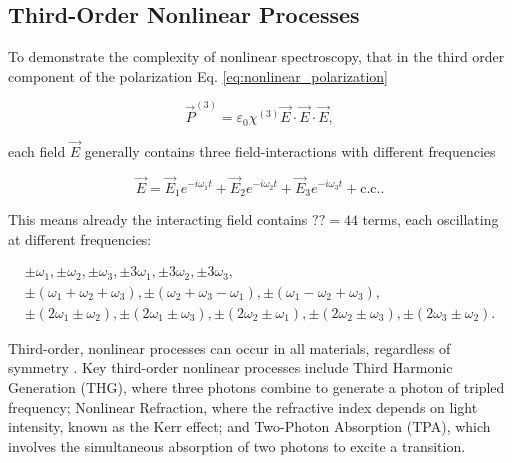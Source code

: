 \subsection{Third-Order Nonlinear Processes}
\label{subsec:third_order}
\noindent
\noindent
To demonstrate the complexity of nonlinear spectroscopy, that in the third order component of the polarization Eq. \eqref{eq:nonlinear_polarization}

\begin{equation}
	\vec{P}^{(3)} = \varepsilon_0 \chi^{(3)} \vec{E} \cdot \vec{E} \cdot \vec{E},
	\label{eq:third_order_polarization}
\end{equation}

each field $\vec{E}$ generally contains three field-interactions with different frequencies

\begin{equation}
\vec{E} = \vec{E}_1 e^{-i \omega_1 t} + \vec{E}_2 e^{-i \omega_2 t} + \vec{E}_3 e^{-i \omega_3 t} + \text{c.c.}.
	\label{eq:explicit_e_field_third_order}
\end{equation}

\noindent
This means already the interacting field contains $?? = 44$ terms, each oscillating at different frequencies: 
 
\begin{align}
	\pm \omega_1, 
	\pm \omega_2, 
	\pm \omega_3, 
	\pm 3 \omega_1, 
	\pm 3 \omega_2, 
	\pm 3 \omega_3, \\
	\pm (\omega_1 + \omega_2 + \omega_3), 
	\pm (\omega_2 + \omega_3 - \omega_1), 
	\pm (\omega_1 - \omega_2 + \omega_3),\\
	\pm (2 \omega_1 \pm \omega_2), 
	\pm (2 \omega_1 \pm \omega_3), 
	\pm (2 \omega_2 \pm \omega_1), 
	\pm (2 \omega_2 \pm \omega_3), 
	\pm (2 \omega_3 \pm \omega_2).
\end{align}


Third-order, nonlinear processes can occur in all materials, regardless of symmetry \cite{hamm2005principlesnonlinearoptical}. Key third-order nonlinear processes include Third Harmonic Generation (THG), where three photons combine to generate a photon of tripled frequency; Nonlinear Refraction, where the refractive index depends on light intensity, known as the Kerr effect; and Two-Photon Absorption (TPA), which involves the simultaneous absorption of two photons to excite a transition.


